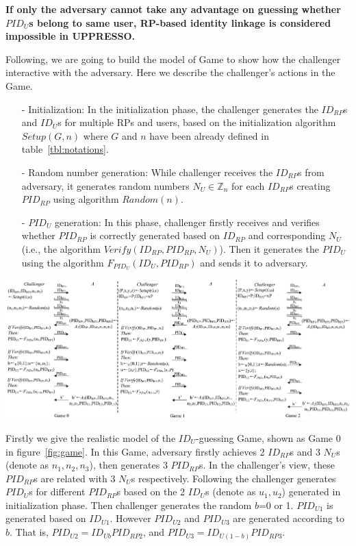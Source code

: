 \textbf{If only the adversary cannot take any advantage on guessing whether $PID_U$s belong to same user, RP-based identity linkage is considered impossible in UPPRESSO.}


Following, we are going to build the model of Game to show how the challenger interactive with the adversary. Here we describe the challenger's actions in the Game.
\begin{itemize}
\vspace{-\topsep}
\item[-] Initialization: In the initialization phase, the challenger generates the $ID_{RP}$s and $ID_U$s for multiple RPs and users, based on the initialization algorithm $Setup(G,n)$ where $G$ and $n$ have been already defined in table~\ref{tbl:notations}.
\vspace{-\topsep}
\item[-] Random number generation: While challenger receives the $ID_{RP}$s from adversary, it generates random numbers $N_U \in \mathbb{Z}_n$ for each $ID_{RP}$s creating $PID_{RP}$ using algorithm $Random(n)$.
\vspace{-\topsep}
\item[-] $PID_U$ generation: In this phase, challenger firstly receives and  verifies whether $PID_{RP}$ is correctly generated based on $ID_{RP}$ and corresponding $N_U$ (i.e., the algorithm $Verify(ID_{RP},PID_{RP},N_U)$). Then it generates the $PID_U$ using the algorithm $F_{PID_U}(ID_U,PID_{RP})$ and sends it to adversary.
\end{itemize}
\vspace{-\topsep}
\begin{strip}
\centering\includegraphics[width=\textwidth, height=0.35\textheight]{fig/game.pdf}
\label{fig:game}
\vspace{-5mm}
\end{strip}
Firstly we give the realistic model of the $ID_U$-guessing Game, shown as Game 0 in figure~\ref{fig:game}. In this Game, adversary firstly achieves 2 $ID_{RP}$s and 3 $N_U$s (denote as $n_1, n_2, n_3$), then generates 3 $PID_{RP}$s. In the challenger's view, these $PID_{RP}$s are related with 3 $N_U$s respectively. Following the challenger generates $PID_U$s for different $PID_{RP}$s based on the 2 $ID_U$s (denote as $u_1, u_2$) generated in initialization phase. 
Then challenger generates the random $b$=0 or 1. $PID_{U1}$ is generated based on $ID_{U1}$. However $PID_{U2}$ and $PID_{U3}$ are generated according to $b$. That is, $PID_{U2}=ID_{Ub}PID_{RP2}$, and $PID_{U3}=ID_{U(1-b)}PID_{RP3}$.  


